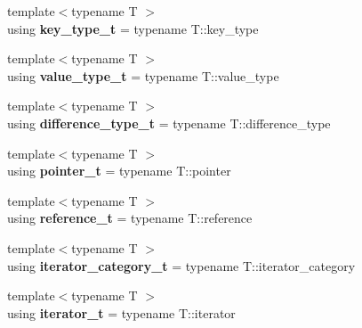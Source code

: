 \begin{DoxyCompactItemize}
\item 
\mbox{\label{namespacenlohmann_1_1detail_a66dfe39f03b05d6b7265a0ff748d64ef}} 
{\footnotesize template$<$typename T $>$ }\\using {\bfseries key\+\_\+type\+\_\+t} = typename T\+::key\+\_\+type
\item 
\mbox{\label{namespacenlohmann_1_1detail_af91beae90c2fb0f931079b3d50a343bc}} 
{\footnotesize template$<$typename T $>$ }\\using {\bfseries value\+\_\+type\+\_\+t} = typename T\+::value\+\_\+type
\item 
\mbox{\label{namespacenlohmann_1_1detail_a3603b59a17d1c5e15050743b847992f2}} 
{\footnotesize template$<$typename T $>$ }\\using {\bfseries difference\+\_\+type\+\_\+t} = typename T\+::difference\+\_\+type
\item 
\mbox{\label{namespacenlohmann_1_1detail_a26dc71e2dd9336587e56062178f9abce}} 
{\footnotesize template$<$typename T $>$ }\\using {\bfseries pointer\+\_\+t} = typename T\+::pointer
\item 
\mbox{\label{namespacenlohmann_1_1detail_a082bdafd3b4c61d9d1e92b35b8f75ee3}} 
{\footnotesize template$<$typename T $>$ }\\using {\bfseries reference\+\_\+t} = typename T\+::reference
\item 
\mbox{\label{namespacenlohmann_1_1detail_ad22d2aa3aab018050ae519f6754366e1}} 
{\footnotesize template$<$typename T $>$ }\\using {\bfseries iterator\+\_\+category\+\_\+t} = typename T\+::iterator\+\_\+category
\item 
\mbox{\label{namespacenlohmann_1_1detail_a9ff93db146174305bce1bc4c54703e11}} 
{\footnotesize template$<$typename T $>$ }\\using {\bfseries iterator\+\_\+t} = typename T\+::iterator
\item 
\mbox{\label{namespacenlohmann_1_1detail_af846b6cf2f926009ff3a7a61495ca383}} 

\end{DoxyCompactItemize}
